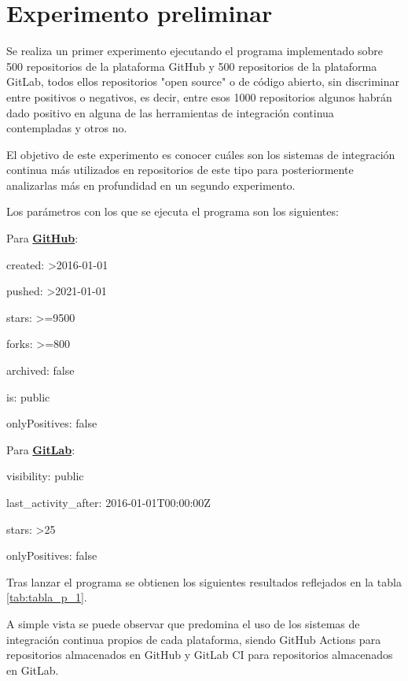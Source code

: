 \section{Experimento preliminar}
Se realiza un primer experimento ejecutando el programa implementado sobre 500 repositorios de la plataforma GitHub y 500 repositorios de la plataforma GitLab, todos ellos repositorios "open source" o de código abierto, sin discriminar entre positivos o negativos, es decir, entre esos 1000 repositorios algunos habrán dado positivo en alguna de las herramientas de integración continua contempladas y otros no.

El objetivo de este experimento es conocer cuáles son los sistemas de integración continua más utilizados en repositorios de este tipo para posteriormente analizarlas más en profundidad en un segundo experimento.

Los parámetros con los que se ejecuta el programa son los siguientes:
\begin{compactitem}
    \item Para \textbf{\underline{GitHub}}:
    \begin{compactitem}
        \item created: \textgreater2016-01-01
        \item pushed: \textgreater2021-01-01
        \item stars: \textgreater=9500
        \item forks: \textgreater=800
        \item archived: false
        \item is: public
        \item onlyPositives: false
    \end{compactitem}
    \item Para \textbf{\underline{GitLab}}:
    \begin{compactitem}
        \item visibility: public
        \item last\_activity\_after: 2016-01-01T00:00:00Z
        \item stars: \textgreater25
        \item onlyPositives: false
    \end{compactitem}
\end{compactitem}

Tras lanzar el programa se obtienen los siguientes resultados reflejados en la tabla \ref{tab:tabla_p_1}.

A simple vista se puede observar que predomina el uso de los sistemas de integración continua propios de cada plataforma, siendo GitHub Actions para repositorios almacenados en GitHub y GitLab CI para repositorios almacenados en GitLab.

